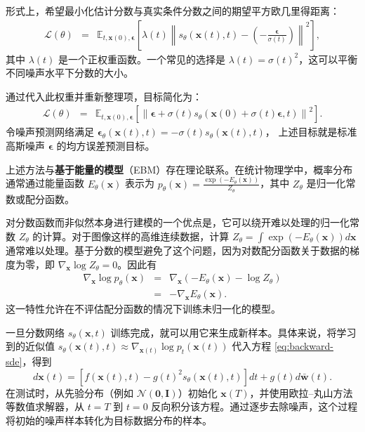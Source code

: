 形式上，希望最小化估计分数与真实条件分数之间的期望平方欧几里得距离：
\begin{eqnarray}
\mathcal{L}(\theta) & = & \mathbb{E}_{t, \mathbf{x}(0), \boldsymbol{\epsilon}} \left[ \lambda(t) \left\| s_\theta(\mathbf{x}(t), t) - \left( -\frac{\boldsymbol{\epsilon}}{\sigma(t)} \right) \right\|^2 \right],
\end{eqnarray}
其中 $\lambda(t)$ 是一个正权重函数。一个常见的选择是 $\lambda(t) = \sigma(t)^2$，这可以平衡不同噪声水平下分数的大小。

通过代入此权重并重新整理项，目标简化为：
\begin{eqnarray}
\mathcal{L}(\theta) & = & \mathbb{E}_{t, \mathbf{x}(0), \boldsymbol{\epsilon}} \left[ \left\| \boldsymbol{\epsilon} + \sigma(t) s_\theta(\mathbf{x}(0) + \sigma(t)\boldsymbol{\epsilon}, t) \right\|^2 \right].
\end{eqnarray}
令噪声预测网络满足
$\boldsymbol{\epsilon}_\theta(\mathbf{x}(t),t)=-\sigma(t)s_\theta(\mathbf{x}(t),t)$，
上述目标就是标准高斯噪声 $\boldsymbol{\epsilon}$ 的均方误差预测目标。

上述方法与\textbf{基于能量的模型}（EBM）存在理论联系。在统计物理学中，概率分布通常通过能量函数 $E_\theta(\mathbf{x})$ 表示为 $p_\theta(\mathbf{x}) = \frac{\exp(-E_\theta(\mathbf{x}))}{Z_\theta}$，其中 $Z_\theta$ 是归一化常数或配分函数。

对分数函数而非似然本身进行建模的一个优点是，它可以绕开难以处理的归一化常数 $Z_\theta$ 的计算。对于图像这样的高维连续数据，计算 $Z_\theta = \int \exp(-E_\theta(\mathbf{x})) d\mathbf{x}$ 通常难以处理。基于分数的模型避免了这个问题，因为对数配分函数关于数据的梯度为零，即 $\nabla_{\mathbf{x}} \log Z_\theta = 0$。因此有
\begin{eqnarray}
\nabla_{\mathbf{x}} \log p_\theta(\mathbf{x}) & = & \nabla_{\mathbf{x}} \left( -E_\theta(\mathbf{x}) - \log Z_\theta \right) \nonumber \\
& = & -\nabla_{\mathbf{x}} E_\theta(\mathbf{x}).
\end{eqnarray}
这一特性允许在不评估配分函数的情况下训练未归一化的模型。

一旦分数网络 $s_\theta(\mathbf{x}, t)$ 训练完成，就可以用它来生成新样本。具体来说，将学习到的近似值 $s_\theta(\mathbf{x}(t), t) \approx \nabla_{\mathbf{x}(t)} \log p_t(\mathbf{x}(t))$ 代入方程 \eqref{eq:backward-sde}，得到
\begin{equation}
d\mathbf{x}(t) = \left[ f(\mathbf{x}(t), t) - g(t)^2 s_\theta(\mathbf{x}(t), t) \right] dt + g(t) d\bar{\mathbf{w}}(t).
\label{eq:learned-reverse-sde}
\end{equation}
在测试时，从先验分布（例如 $\mathcal{N}(\mathbf{0}, \mathbf{I})$）初始化 $\mathbf{x}(T)$，并使用欧拉--丸山方法等数值求解器，从 $t=T$ 到 $t=0$ 反向积分该方程。通过逐步去除噪声，这个过程将初始的噪声样本转化为目标数据分布的样本。

